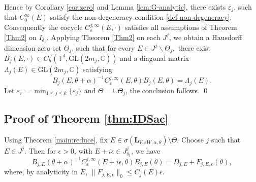 \documentclass[reqno,11pt]{amsart}
\def\GL{{\mathrm{GL}}}
\begin{document}
Hence by Corollary \ref{cor:zero} and Lemma \ref{lem:G-analytic}, there exists $\varepsilon_j$, such that $C_0^\infty(E)$ satisfy the non-degeneracy condition \eqref{def-non-degeneracy}. Consequently  the cocycle
$ C_\varepsilon^{j,\infty}(E,\cdot)$
satisfies all assumptions of Theorem \ref{Thm2} on $I_{\delta_1}$. Applying Theorem \ref{Thm2} on each $J^j$, we obtain a Hausdorff dimension zero set $\Theta_j$, such that for every
$E\in J^j\backslash\Theta_j,$
there exist
$B_j(E,\cdot)\in C_h^\omega(\mathbb T^d,\GL(2m_j,\mathbb C))$
and a diagonal matrix
$\Lambda_j(E)\in \GL(2m_j,\mathbb C)$
satisfying
$$
B_j(E,\theta+\alpha)^{-1}C_{\varepsilon}^{j,\infty}(E,\theta)B_j(E,\theta)=\Lambda_j(E).
$$
Let $\varepsilon_r=\min_{1\leq j\leq k}\{\varepsilon_j\}$ and $\Theta=\cup \Theta_j$, 
the conclusion follows. \qed





\subsection*{Proof of Theorem \ref{thm:IDSac}}
    Using Theorem \ref{main:reduce}, 
fix
$E\in\sigma(\mathbf L_{V,\varepsilon W,\alpha,\theta})\setminus\Theta .$
Choose $j$ such that $E\in J^j$.  Then for $\epsilon>0$, with $E+i\epsilon\in J^j_{\delta_1}$, we have
$$
B_{j,E}(\theta+\alpha)^{-1}C_{\varepsilon}^{j,\infty}(E+i\epsilon,\theta)B_{j,E}(\theta)=D_{j,E}+F_{j,E,\epsilon}(\theta),
$$
where, by analyticity in $E$,
$\|F_{j,E,\epsilon}\|_0\le C_j(E)\epsilon.$
\end{document}
